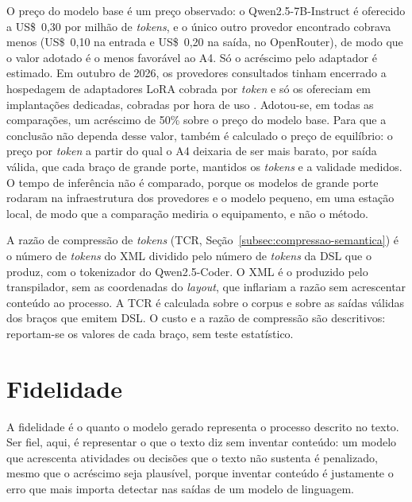 O preço do modelo base é um preço observado: o Qwen2.5-7B-Instruct é oferecido a US\$~0,30 por milhão de \textit{tokens}, e o único outro provedor encontrado cobrava menos (US\$~0,10 na entrada e US\$~0,20 na saída, no OpenRouter), de modo que o valor adotado é o menos favorável ao A4. Só o acréscimo pelo adaptador é estimado. Em outubro de 2026, os provedores consultados tinham encerrado a hospedagem de adaptadores LoRA cobrada por \textit{token} e só os ofereciam em implantações dedicadas, cobradas por hora de uso \cite{togetherlora2026, fireworkslora2026}. Adotou-se, em todas as comparações, um acréscimo de 50\% sobre o preço do modelo base. Para que a conclusão não dependa desse valor, também é calculado o preço de equilíbrio: o preço por \textit{token} a partir do qual o A4 deixaria de ser mais barato, por saída válida, que cada braço de grande porte, mantidos os \textit{tokens} e a validade medidos. O tempo de inferência não é comparado, porque os modelos de grande porte rodaram na infraestrutura dos provedores e o modelo pequeno, em uma estação local, de modo que a comparação mediria o equipamento, e não o método.

A razão de compressão de \textit{tokens} (TCR, Seção~\ref{subsec:compressao-semantica}) é o número de \textit{tokens} do XML dividido pelo número de \textit{tokens} da DSL que o produz, com o tokenizador do Qwen2.5-Coder. O XML é o produzido pelo transpilador, sem as coordenadas do \textit{layout}, que inflariam a razão sem acrescentar conteúdo ao processo. A TCR é calculada sobre o corpus e sobre as saídas válidas dos braços que emitem DSL. O custo e a razão de compressão são descritivos: reportam-se os valores de cada braço, sem teste estatístico.

\section{Fidelidade}\label{subsec:fidelidade}

A fidelidade é o quanto o modelo gerado representa o processo descrito no texto. Ser fiel, aqui, é representar o que o texto diz sem inventar conteúdo: um modelo que acrescenta atividades ou decisões que o texto não sustenta é penalizado, mesmo que o acréscimo seja plausível, porque inventar conteúdo é justamente o erro que mais importa detectar nas saídas de um modelo de linguagem.

